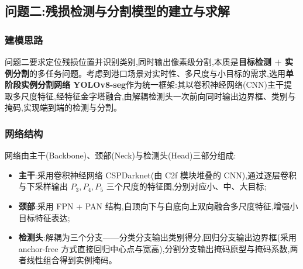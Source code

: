%

\subsection{问题二:残损检测与分割模型的建立与求解}

\subsubsection{建模思路}

问题二要求定位残损位置并识别类别,同时输出像素级分割,本质是\textbf{目标检测 + 实例分割}的多任务问题。考虑到港口场景对实时性、多尺度与小目标的需求,选用\textbf{单阶段实例分割网络 YOLOv8-seg}作为统一框架:其以卷积神经网络(CNN)主干提取多尺度特征,经特征金字塔融合,由解耦检测头一次前向同时输出边界框、类别与掩码,实现端到端的检测与分割。

\subsubsection{网络结构}

网络由主干(Backbone)、颈部(Neck)与检测头(Head)三部分组成:

\begin{itemize}
\item \textbf{主干}:采用卷积神经网络 CSPDarknet(由 C2f 模块堆叠的 CNN),通过逐层卷积与下采样输出 $P_3,P_4,P_5$ 三个尺度的特征图,分别对应小、中、大目标;
\item \textbf{颈部}:采用 FPN + PAN 结构,自顶向下与自底向上双向融合多尺度特征,增强小目标特征表达;
\item \textbf{检测头}:解耦为三个分支——分类分支输出类别得分,回归分支输出边界框(采用 anchor-free 方式直接回归中心点与宽高),分割分支输出掩码原型与掩码系数,两者线性组合得到实例掩码。
\end{itemize}

